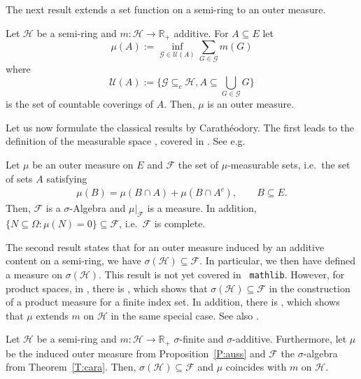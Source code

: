 \documentclass[lean]{DraftAFM}
\begin{document}
The next result extends a set function on a semi-ring to an outer measure.

\begin{proposition} %
  Let \label{P:auss} $\mathcal H$ be a semi-ring and $m: \mathcal
  H\to\mathbb R_+$ additive. For $A\subseteq E$ let
  $$ \mu(A) := \inf_{\mathcal G \in \mathcal U(A)}
    \sum_{G\in\mathcal G} m(G)$$ where
  $$ \mathcal U(A) := \big\{\mathcal G \subseteq_c \mathcal H,
    A\subseteq \bigcup_{G\in\mathcal G} G\big\}$$ is the set of
    countable coverings of $A$. Then, $\mu$ is an outer measure.
\end{proposition}

\sloppy Let us now formulate the classical results by
Carathéodory. The first leads to the definition of the measurable
space , covered in
. See e.g.\ \cite[Theorem 2.1]{Kallenberg2020}

\begin{theorem}\label{T:cara} Let $\mu$ be an outer measure on
  $E$ and $\mathcal F$ the set of $\mu$-measurable sets,
  i.e.\ the set of sets $A$ satisfying
  \begin{align*}
    \mu(B) = \mu(B\cap A) + \mu(B\cap A^c), \qquad B \subseteq E.
  \end{align*}
  Then, $\mathcal F$ is a $\sigma$-Algebra and $\mu|_{\mathcal F}$ is
  a measure. In addition, $\{N\subseteq \Omega:
  \mu(N)=0\}\subseteq \mathcal F$, i.e.\ $\mathcal F$ is complete.
\end{theorem}

\noindent
\sloppy The second result states that for an outer measure induced by
an additive content on a semi-ring, we have $\sigma(\mathcal H)
\subseteq \mathcal F$. In particular, we then have defined a measure
on $\sigma(\mathcal H)$. This result is not yet covered in {\tt
  mathlib}. However, for product spaces, in
, there is
, which shows that $\sigma(\mathcal H)
\subseteq \mathcal F$ in the construction of a product
  measure for a finite index set. In addition, there is
, which shows that $\mu$ extends $m$ on $\mathcal
H$ in the same special case. See also \cite[Theorem
  2.5]{Kallenberg2020}.

\begin{theorem}\label{T:masseind}
  Let $\mathcal H$ be a semi-ring and $m: \mathcal H\to\mathbb R_+$
  $\sigma$-finite and $\sigma$-additive. Furthermore, let $\mu$ be the
  induced outer measure from Proposition~\ref{P:auss} and $\mathcal F$
  the $\sigma$-algebra from Theorem~\ref{T:cara}. Then,
  $\sigma(\mathcal H)\subseteq\mathcal F$ and $\mu$ coincides with $m$
  on $\mathcal H$.
\end{theorem}
\end{document}
